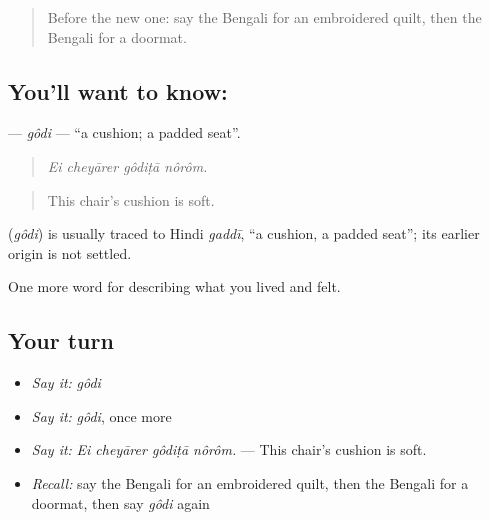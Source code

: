 \label{lesson:BN-C509-godi}



\begin{quote}
Before the new one: say the Bengali for an embroidered quilt, then the Bengali for a doormat.
\end{quote}

\subsection*{You'll want to know: }
\textbf{} — \emph{gôdi} — \textquotedblleft{}a cushion; a padded seat\textquotedblright{}.

\begin{quote}
   
\end{quote}

\begin{quote}
\emph{Ei cheyārer gôdiṭā nôrôm.}
\end{quote}

\begin{quote}
This chair's cushion is soft.
\end{quote}

\begin{cousinweb}
\textbf{} (\emph{gôdi}) is usually traced to Hindi \emph{gaddī}, \textquotedblleft{}a cushion, a padded seat\textquotedblright{}; its earlier origin is not settled.
\end{cousinweb}

\begin{grammarlens}[title={What you've built}]
One more word for describing what you lived and felt.
\end{grammarlens}

\subsection*{Your turn}
\begin{itemize}
\raggedright
  \item \emph{Say it:} \emph{gôdi}
  \item \emph{Say it:} \emph{gôdi}, once more
  \item \emph{Say it:} \emph{Ei cheyārer gôdiṭā nôrôm.} — This chair's cushion is soft.
  \item \emph{Recall:} say the Bengali for an embroidered quilt, then the Bengali for a doormat, then say \emph{gôdi} again
\end{itemize}

